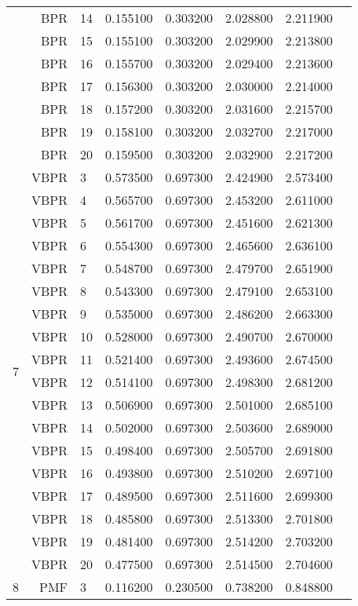 \documentclass[a4paper,12pt]{article}
\begin{document}
\begin{center}
\begin{longtable}{lrlrrrrr}
& BPR & 14 & 0.155100 & 0.303200 & 2.028800 & 2.211900 \\
& BPR & 15 & 0.155100 & 0.303200 & 2.029900 & 2.213800 \\
& BPR & 16 & 0.155700 & 0.303200 & 2.029400 & 2.213600 \\
& BPR & 17 & 0.156300 & 0.303200 & 2.030000 & 2.214000 \\
& BPR & 18 & 0.157200 & 0.303200 & 2.031600 & 2.215700 \\
& BPR & 19 & 0.158100 & 0.303200 & 2.032700 & 2.217000 \\
& BPR & 20 & 0.159500 & 0.303200 & 2.032900 & 2.217200 \\ \hline
\multirow{18}{1cm}{7} & VBPR & 3 & 0.573500 & 0.697300 & 2.424900 & 2.573400 \\
& VBPR & 4 & 0.565700 & 0.697300 & 2.453200 & 2.611000 \\
& VBPR & 5 & 0.561700 & 0.697300 & 2.451600 & 2.621300 \\
& VBPR & 6 & 0.554300 & 0.697300 & 2.465600 & 2.636100 \\
& VBPR & 7 & 0.548700 & 0.697300 & 2.479700 & 2.651900 \\
& VBPR & 8 & 0.543300 & 0.697300 & 2.479100 & 2.653100 \\
& VBPR & 9 & 0.535000 & 0.697300 & 2.486200 & 2.663300 \\
& VBPR & 10 & 0.528000 & 0.697300 & 2.490700 & 2.670000 \\
& VBPR & 11 & 0.521400 & 0.697300 & 2.493600 & 2.674500 \\
& VBPR & 12 & 0.514100 & 0.697300 & 2.498300 & 2.681200 \\
& VBPR & 13 & 0.506900 & 0.697300 & 2.501000 & 2.685100 \\
& VBPR & 14 & 0.502000 & 0.697300 & 2.503600 & 2.689000 \\
& VBPR & 15 & 0.498400 & 0.697300 & 2.505700 & 2.691800 \\
& VBPR & 16 & 0.493800 & 0.697300 & 2.510200 & 2.697100 \\
& VBPR & 17 & 0.489500 & 0.697300 & 2.511600 & 2.699300 \\
& VBPR & 18 & 0.485800 & 0.697300 & 2.513300 & 2.701800 \\
& VBPR & 19 & 0.481400 & 0.697300 & 2.514200 & 2.703200 \\
& VBPR & 20 & 0.477500 & 0.697300 & 2.514500 & 2.704600 \\ \hline
\multirow{18}{1cm}{8} & PMF & 3 & 0.116200 & 0.230500 & 0.738200 & 0.848800 \\

\end{longtable}
\end{center}
\end{document}
